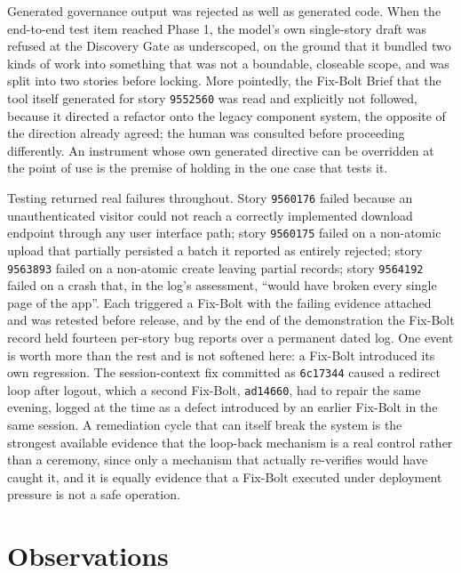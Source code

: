Generated governance output was rejected as well as generated code. When the end-to-end test item reached Phase 1, the model's own single-story draft was refused at the Discovery Gate as underscoped, on the ground that it bundled two kinds of work into something that was not a boundable, closeable scope, and was split into two stories before locking. More pointedly, the Fix-Bolt Brief that the tool itself generated for story \texttt{9552560} was read and explicitly not followed, because it directed a refactor onto the legacy component system, the opposite of the direction already agreed; the human was consulted before proceeding differently. An instrument whose own generated directive can be overridden at the point of use is the premise of  holding in the one case that tests it.

Testing returned real failures throughout. Story \texttt{9560176} failed because an unauthenticated visitor could not reach a correctly implemented download endpoint through any user interface path; story \texttt{9560175} failed on a non-atomic upload that partially persisted a batch it reported as entirely rejected; story \texttt{9563893} failed on a non-atomic create leaving partial records; story \texttt{9564192} failed on a crash that, in the log's assessment, ``would have broken every single page of the app''. Each triggered a Fix-Bolt with the failing evidence attached and was retested before release, and by the end of the demonstration the Fix-Bolt record held fourteen per-story bug reports over a permanent dated log. One event is worth more than the rest and is not softened here: a Fix-Bolt introduced its own regression. The session-context fix committed as \texttt{6c17344} caused a redirect loop after logout, which a second Fix-Bolt, \texttt{ad14660}, had to repair the same evening, logged at the time as a defect introduced by an earlier Fix-Bolt in the same session. A remediation cycle that can itself break the system is the strongest available evidence that the loop-back mechanism is a real control rather than a ceremony, since only a mechanism that actually re-verifies would have caught it, and it is equally evidence that a Fix-Bolt executed under deployment pressure is not a safe operation.

\section{Observations}
\label{sec:demo_observations}

